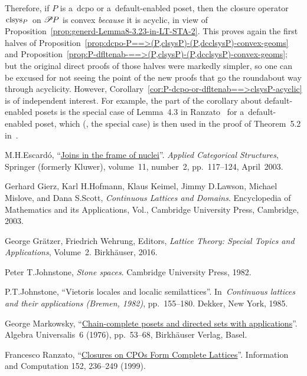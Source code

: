 \documentclass[11pt,letterpaper]{article}
\renewcommand{\emph}[1]{\textit{#1\/}}
\begin{document}
Therefore, if $P$ is a~dcpo or a~default-enabled poset,
then the closure operator $\mspace{2mu}\mathop{\smash{\mathrm{clsys}}}\nolimits_P\mspace{2mu}$ on $\mathscr{P}\mspace{-1mu} P$
is convex \emph{because} it is acyclic,
	in view of Proposition~\ref{prop:generd-Lemma8-3.23-in-LT-STA-2}.
This proves again the first halves of
	Proposition~\ref{prop:dcpo-P==>(P,clsysP)-(P,dcclsysP)-convex-geoms}
	and Proposition~\ref{prop:P-dfltenab-==>(P,clsysP)-(P,dcclsysP)-convex-geoms};
but the original direct proofs of those halves were markedly simpler,
so one can be excused for not seeing the point
	of the new proofs that go the roundabout way through acyclicity.
However, Corollary~\ref{cor:P-dcpo-or-dfltenab==>clsysP-acyclic} is of independent interest.
For example, the part of the corollary about default-enabled posets
is the special case of Lemma~4.3 in Ranzato~\cite{ranzato} for a~default-enabled poset,
which (\ie, the special case) is then used in the proof of Theorem~5.2 in~\cite{ranzato}.


\begin{thebibliography}{9}

 M.\:H.\:Escard\'o,	%
	``\href{http://www.cs.bham.ac.uk/~mhe/papers/hmj.pdf}%
		{Joins in the frame of nuclei}''.
	\textit{Applied Categorical Structures}, Springer (formerly Kluwer), volume~11, number~2,
	pp.~117--124, April~2003.

 Gerhard Gierz, Karl H.\;Hofmann, Klaus Keimel, Jimmy D.\;Lawson,
	Michael Mislove, and Dana S.\;Scott,
	\textit{Continuous Lattices and Domains}.
	Encyclopedia of Mathematics and its Applications, Vol.,
	Cambridge University Press, Cambridge, 2003.

 George Gr\"atzer, Friedrich Wehrung, Editors,
	\textit{Lattice Theory: Special Topics and Applications}, Volume~2.
	Birkh\"auser, 2016.

 Peter T.\:Johnstone,
	\textit{Stone spaces}.
	Cambridge University Press, 1982.

 P.\:T.\:Johnstone,
	``Vietoris locales and localic semilattices''.
	In~\textit{Continuous lattices and their applications {\rm(}Bremen, 1982\/{\rm)}}, pp.~155--180.
	Dekker, New York, 1985.

 George Markowsky,
	``\href{http://citeseerx.ist.psu.edu/viewdoc/download?doi=10.1.1.454.7687&rep=rep1&type=pdf}%
		{Chain-complete posets and directed sets with applications}''.
	Algebra Universalis~6 (1976), pp.~53--68, Birkh\"auser Verlag, Basel.

 Francesco Ranzato,
	``\href{http://www.math.unipd.it/~ranzato/papers/ic99.pdf}%
		{Closures on CPOs Form Complete Lattices}''.
	Information and Computation 152, 236--249 (1999).

\end{thebibliography}
\end{document}
